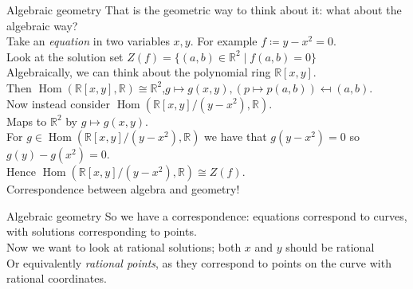 \documentclass[15pt]{beamer}
\newcommand{\R}{\mathbb{R}}
\DeclareMathOperator{\Hom}{Hom}
\begin{document}
\begin{frame}{Algebraic geometry}
    That is the geometric way to think about it: what about the algebraic way?\\\pause
    Take an \textit{equation} in two variables $x,y$. For example $f \coloneqq y- x^2 = 0$.\\\pause
    Look at the solution set $Z(f) = \{(a,b) \in \R^2 \mid f(a,b) = 0\}$\\\pause
    Algebraically, we can think about the polynomial ring $\R[x,y]$.\\\pause
    Then $\Hom(\R[x,y],\R) \cong \R^2$,\pause $ g \mapsto g(x,y), (p \mapsto p(a,b)) \mapsfrom (a,b)$.\\\pause
    Now instead consider $\Hom(\R[x,y]/(y-x^2), \R)$. \\\pause
    Maps to $\R^2$ by $g \mapsto g(x,y)$.\\\pause
    For $g \in \Hom(\R[x,y]/(y-x^2),\R)$ we have that $g(y-x^2) = 0$ so $g(y) - g(x^2) = 0$.\\\pause
    Hence $\Hom(\R[x,y]/(y-x^2), \R) \cong Z(f)$.\\\pause
    \vspace{10pt}
    Correspondence between algebra and geometry!
\end{frame}

\begin{frame}{Algebraic geometry}
    So we have a correspondence: equations correspond to curves, with solutions corresponding to points.\\\pause
    Now we want to look at rational solutions; both $x$ and $y$ should be rational\\\pause
    Or equivalently \textit{rational points}, as they correspond to points on the curve with rational coordinates.\pause
    \begin{center}
    \end{center}
\end{frame}
\end{document}
